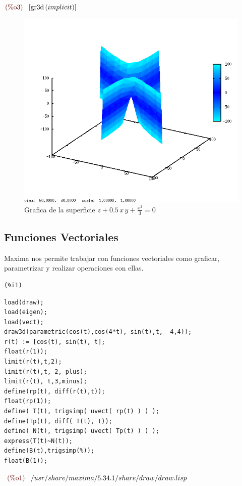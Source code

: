 \documentclass[12pt]{article}
\begin{document}
\begin{math}\displaystyle
\parbox{8ex}{\color{labelcolor}(\%o3) }
[\mathrm{gr3d}\left( implicit\right) ]
\end{math}
\begin{figure}[H]
\centering
\includegraphics[scale=0.5]{1.png}
\caption{Grafica de la superficie $z+0.5\,x\,y+\frac{{x}^{2}}{3}=0$}
\end{figure}
\subsection{Funciones Vectoriales}
Maxima nos permite trabajar con funciones vectoriales como graficar, parametrizar y realizar operaciones con ellas.

\noindent
\begin{minipage}[t]{8ex}{\color{red}\bf
\begin{verbatim}
(%i1) 
\end{verbatim}}
\end{minipage}
\begin{minipage}[t]{\textwidth}{\color{blue}
\begin{verbatim}
load(draw);
load(eigen);
load(vect);
draw3d(parametric(cos(t),cos(4*t),-sin(t),t, -4,4));
r(t) := [cos(t), sin(t), t];
float(r(1));
limit(r(t),t,2);
limit(r(t),t, 2, plus);
limit(r(t), t,3,minus);
define(rp(t), diff(r(t),t));
float(rp(1));
define( T(t), trigsimp( uvect( rp(t) ) ) );
define(Tp(t), diff( T(t), t));
define( N(t), trigsimp( uvect( Tp(t) ) ) );
express(T(t)~N(t));
define(B(t),trigsimp(%));
float(B(1));
\end{verbatim}}
\end{minipage}
\begin{math}\displaystyle
\parbox{8ex}{\color{labelcolor}(\%o1) }
/usr/share/maxima/5.34.1/share/draw/draw.lisp
\end{math}
\end{document}
